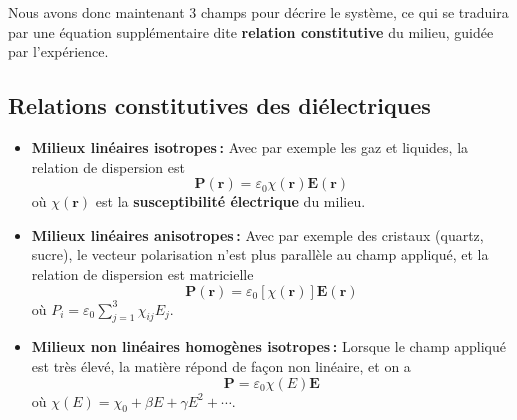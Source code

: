     Nous avons donc maintenant 3 champs pour décrire le système, ce qui se traduira par une équation supplémentaire dite \textbf{relation constitutive} du milieu, guidée par l’expérience.

    \subsection{Relations constitutives des diélectriques}

        \begin{itemize}
            \item \textbf{Milieux linéaires isotropes :} Avec par exemple les gaz et liquides, la relation de dispersion est
            \[ \mathbf{P}(\mathbf{r}) = \varepsilon_0 \chi(\mathbf{r}) \mathbf{E}(\mathbf{r}) \]   
            où $\chi(\mathbf{r})$ est la \textbf{susceptibilité électrique} du milieu.
            \item \textbf{Milieux linéaires anisotropes :} Avec par exemple des cristaux (quartz, sucre), le vecteur polarisation n’est plus parallèle au champ appliqué, et la relation de dispersion est matricielle 
            \[ \mathbf{P}(\mathbf{r}) = \varepsilon_0 [\chi(\mathbf{r})] \mathbf{E}(\mathbf{r}) \]   
            où $P_i = \varepsilon_0 \sum_{j=1}^3 \chi_{ij}E_j$.
            \item \textbf{Milieux non linéaires homogènes isotropes :} Lorsque le champ appliqué est très élevé, la matière répond de façon non linéaire, et on a 
            \[ \mathbf{P} = \varepsilon_0 \chi(E) \mathbf{E} \]   
            où $\chi(E) = \chi_0 + \beta E + \gamma E^2 + \cdots$.
        \end{itemize}


